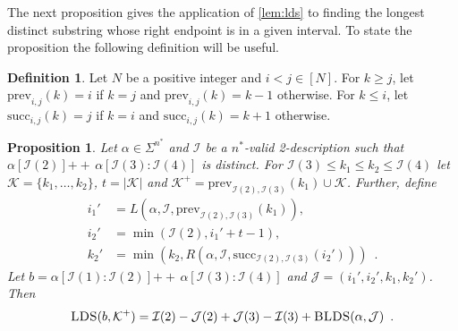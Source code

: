 \documentclass[12pt]{article}
\newcommand{\concat}{\ensuremath{+\!\!\!\!+\,}}
\newcommand{\Iset}{\mathcal{I}}
\newcommand{\Jset}{\mathcal{J}}
\newcommand{\Kset}{\mathcal{K}}
\newcommand{\blds}{\textsc{BLDS}}
\newcommand{\prev}{\mathrm{prev}}
\newcommand{\suc}{\mathrm{succ}}
\newcommand{\upto}{\mathbin{:}}
\newcommand{\lds}{\textsc{LDS}}
\newtheorem{proposition}[theorem]{Proposition}
\theoremstyle{definition}
\newtheorem{definition}[theorem]{Definition}
\begin{document}
The next proposition gives the application of \cref{lem:lds} to finding the longest distinct substring whose right endpoint is in a given interval.
To state the proposition the following definition will be useful.
\begin{definition}
Let $N$ be a positive integer and $i < j \in [N]$.
For $k \ge j$, let $\prev_{i, j}(k) = i$ if $k = j$ and $\prev_{i, j}(k) = k-1$ otherwise.  For $k \le i$, let $\suc_{i, j}(k) = j$ if $k = i$ and $\suc_{i, j}(k) = k+1$ otherwise.
\end{definition}

\begin{proposition}
\label{prop:blds}
Let $\alpha \in \Sigma^{n^*}$ and $\Iset$ be a $n^*$-valid 2-description such that $\alpha[\Iset(2)] \concat \alpha[\Iset(3) \upto \Iset(4)]$ is distinct.
For $\Iset(3) \le k_1 \le k_2 \le \Iset(4)$ let $\Kset = \{k_1, \ldots, k_2\}$, $t = |\Kset|$ and $\Kset^+ = \prev_{\Iset(2), \Iset(3)}(k_1) \cup \Kset$. Further, define
\begin{align*}
i_1' &= L(\alpha, \Iset, \prev_{\Iset(2), \Iset(3)}(k_1)), \\
i_2' &= \min(\Iset(2), i_1' + t - 1), \\
k_2' &= \min(k_2, R(\alpha, \Iset, \suc_{\Iset(2), \Iset(3)}(i_2'))) \enspace .
\end{align*}
Let $b = \alpha[\Iset(1) \upto \Iset(2)] \concat \alpha[\Iset(3) \upto \Iset(4)]$ and $\Jset = (i_1', i_2', k_1, k_2')$.
Then
\[
\lds(b, \Kset^+)
=  \Iset(2) - \Jset(2) + \Jset(3) - \Iset(3) + \blds(\alpha, \Jset) \enspace.
\]
\end{proposition} 
\end{document}
